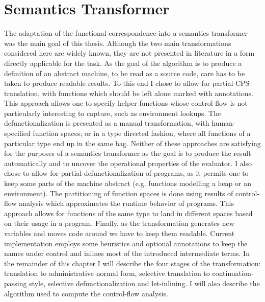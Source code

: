 \chapter{Semantics Transformer}\label{chapter:transformer}
The adaptation of the functional correspondence into a semantics transformer was the main goal of this thesis.
Although the two main transformations considered here are widely known, they are not presented in literature in a form directly applicable for the task.
As the goal of the algorithm is to produce a definition of an abstract machine, to be read as a source code, care has to be taken to produce readable results.
To this end I chose to allow for partial CPS translation, with functions which should be left alone marked with annotations.
This approach allows one to specify helper functions whose control-flow is not particularly interesting to capture, such as environment lookups.
The defunctionalization is presented as a manual transformation, with human-specified function spaces; or in a type directed fashion, where all functions of a particular type end up in the same bag.
Neither of these approaches are satisfying for the purposes of a semantics transformer as the goal is to produce the result automatically and to uncover the operational properties of the evaluator.
I also chose to allow for partial defunctionalization of programs, as it permits one to keep some parts of the machine abstract (e.g. functions modelling a heap or an environment).
The partitioning of function spaces is done using results of control-flow analysis which approximates the runtime behavior of programs.
This approach allows for functions of the same type to land in different spaces based on their usage in a program.
Finally, as the transformation generates new variables and moves code around we have to keep them readable.
Current implementation employs some heuristics and optional annotations to keep the names under control and inlines most of the introduced intermediate terms.
In the remainder of this chapter I will describe the four stages of the transformation: translation to administrative normal form, selective translation to continuation-passing style, selective defunctionalization and let-inlining.
I will also describe the algorithm used to compute the control-flow analysis.



